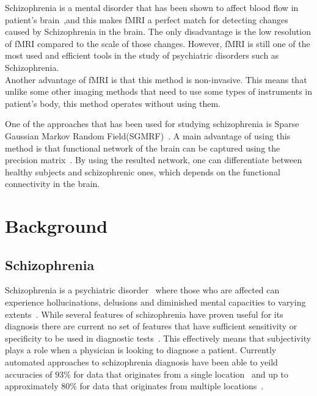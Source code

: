 \documentclass{article} %
\begin{document}
Schizophrenia is a mental disorder that has been shown to affect blood flow in patient's brain~\cite{Kenji_2010},and this makes fMRI a perfect match for detecting changes caused by Schizophrenia in the brain. The only disadvantage is the low resolution of fMRI compared to the scale of those changes. However, fMRI is still one of the most used and efficient tools in the study of psychiatric disorders such as Schizophrenia.   \\

Another advantage of fMRI is that this method is non-invasive. This means that unlike some other imaging methods that need to use some types of instruments in patient's body, this method operates without using them. 

One of the approaches that has been used for studying schizophrenia is Sparse Gaussian Markov Random Field(SGMRF)~\cite{Rish_2013}\cite{Rosa_2013}. A main advantage of using this method is that functional network of the brain can be captured using the precision matrix~\cite{Rish_2013}.
By using the resulted network, one can differentiate between healthy subjects and schizophrenic ones, which depends on the functional connectivity in the brain.      


\section{Background}

\subsection{Schizophrenia}
Schizophrenia is a psychiatric disorder~\cite{Rish_2013} where those who are 
affected can experience hollucinations, delusions and diminished mental 
capacities to varying extents~\cite{jablensky2010diagnostic}. While several
features of schizophrenia have proven useful for its diagnosis there are
current no set of features that have sufficient sensitivity or specificity
to be used in diagnostic tests~\cite{jablensky2010diagnostic}. This 
effectively means that subjectivity plays a role when a physician is
looking to diagnose a patient. Currently automated approaches to schizophrenia
diagnosis have  been able to yeild accuracies of $93\%$ for data that 
originates from a single location~\cite{Rish_2013} and up to approximately 
$80\%$ for data that originates from multiple locations~\cite{Cheng2015}.
\end{document}
